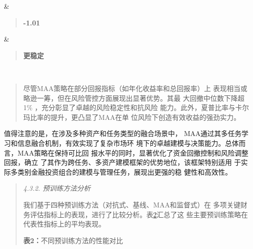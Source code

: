 \documentclass[UTF8]{ctexart}
\begin{document}
{\begin{longtable}[]
\begin{minipage}[t]{\linewidth}
\end{minipage} & \begin{minipage}[t]{\linewidth}\raggedright
\begin{quote}
\textbf{-1.01}
\end{quote}
\end{minipage} & \begin{minipage}[t]{\linewidth}\raggedright
\begin{quote}
\textbf{更稳定}
\end{quote}
\end{minipage} \\
\end{longtable}
}

\begin{quote}
尽管MAA策略在部分回报指标（如年化收益率和总回报率）上
表现相当或略逊一筹，但在风险管控方面展现出显著优势。其最
大回撤中位数下降超1\% ，充分彰显了卓越的风险稳定性和抗风险
能力。此外，夏普比率与卡尔玛比率的提升，更凸显了MAA在单
位风险下创造有效收益的强劲实力。
\end{quote}

值得注意的是，在涉及多种资产和任务类型的融合场景中，
MAA通过其多任务学习和信息融合机制，有效实现了复杂市场环
境下的卓越建模与决策能力。总体而言，MAA策略在保持可比回
报水平的同时，显著优化了资金回撤控制和风险调整回报，确立
了其作为跨任务、多资产建模框架的优势地位，该框架特别适用
于实际多类别金融投资组合的建模与管理任务，展现出更强的稳 健性和高效性。

\begin{quote}
\emph{4.3.2. 预训练方法分析}

我们基于四种预训练方法（对抗式、基线、MAA和监督式）在
多项关键财务评估指标上的表现，进行了比较分析。表\hyperref[bookmark47]{2}汇总了这
些主要预训练策略在代表性指标上的平均表现。

\textbf{表2：}不同预训练方法的性能对比
\end{quote}
\end{document}
